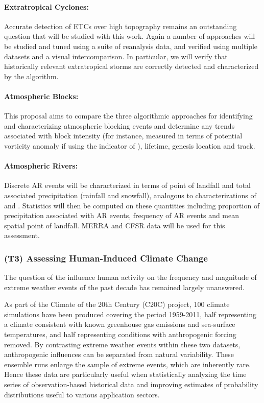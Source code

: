 \documentclass[11pt]{article}
\begin{document}
\paragraph{Extratropical Cyclones:}  Accurate detection of ETCs over high topography remains an outstanding question that will be studied with this work.  Again a number of approaches will be studied and tuned using a suite of reanalysis data, and verified using multiple datasets and a visual intercomparison.  In particular, we will verify that historically relevant extratropical storms are correctly detected and characterized by the algorithm.

\paragraph{Atmospheric Blocks:}  This proposal aims to compare the three algorithmic approaches for identifying and characterizing atmospheric blocking events and determine any trends associated with block intensity (for instance, measured in terms of potential vorticity anomaly if using the indicator of \cite{schwierz2004perspicacious}), lifetime, genesis location and track.

\paragraph{Atmospheric Rivers:}  Discrete AR events will be characterized in terms of point of landfall and total associated precipitation (rainfall and snowfall), analogous to characterizations of \cite{neiman2008meteorological} and \cite{guan2010extreme}.  Statistics will then be computed on these quantities including proportion of precipitation associated with AR events, frequency of AR events and mean spatial point of landfall.  MERRA and CFSR data will be used for this assessment.

\subsubsection{(T3) Assessing Human-Induced Climate Change}

The question of the influence human activity on the frequency and magnitude of extreme weather events of the past decade has remained largely unanswered.

As part of the Climate of the 20th Century (C20C) project, 100 climate simulations have been produced covering the period 1959-2011, half representing a climate consistent with known greenhouse gas emissions and sea-surface temperatures, and half representing conditions with anthropogenic forcing removed.  By contrasting extreme weather events within these two datasets, anthropogenic influences can be separated from natural variability. These ensemble runs enlarge the sample of extreme events, which are inherently rare. Hence these data are particularly useful when statistically analyzing the time series of observation-based historical data and improving estimates of probability distributions useful to various application sectors.
\end{document}

